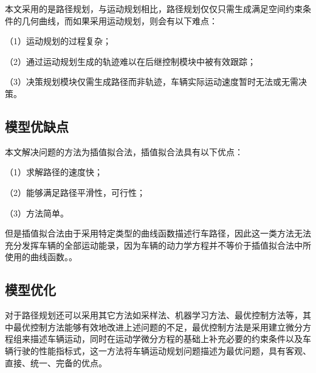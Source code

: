 \documentclass{article}
\begin{document}
本文采用的是路径规划，与运动规划相比，路径规划仅仅只需生成满足空间约束条件的几何曲线，而如果采用运动规划，则会有以下难点：

（1）运动规划的过程复杂；

（2）通过运动规划生成的轨迹难以在后继控制模块中被有效跟踪；

（3）决策规划模块仅需生成路径而非轨迹，车辆实际运动速度暂时无法或无需决策。\cite{李柏2018自动驾驶车辆运动规划方法综述}

\subsection{模型优缺点}
本文解决问题的方法为插值拟合法，插值拟合法具有以下优点：

（1）求解路径的速度快；

（2）能够满足路径平滑性，可行性；

（3）方法简单。

但是插值拟合法由于采用特定类型的曲线函数描述行车路径，因此这一类方法无法充分发挥车辆的全部运动能录，因为车辆的动力学方程并不等价于插值拟合法中所使用的曲线函数。\cite{li2018balancing}。

\subsection{模型优化}
对于路径规划还可以采用其它方法如采样法、机器学习方法、最优控制方法等，其中最优控制方法能够有效地改进上述问题的不足，最优控制方法是采用建立微分方程组来描述车辆运动，同时在运动学微分方程的基础上补充必要的约束条件以及车辆行驶的性能指标式，这一方法将车辆运动规划问题描述为最优问题，具有客观、直接、统一、完备的优点。\cite{姚君延2018基于深度增强学习的路径规划算法研究}

\newpage

\section*{}


\thispagestyle{empty}
\newpage
\end{document}
